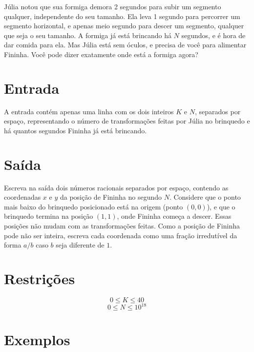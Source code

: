 Júlia notou que sua formiga demora 2 segundos para subir um segmento qualquer, independente do seu tamanho. Ela leva 1 segundo para percorrer um segmento horizontal, e apenas meio segundo para descer um segmento, qualquer que seja o seu tamanho. A formiga já está brincando há $N$ segundos, e é hora de dar comida para ela. Mas Júlia está sem óculos, e precisa de você para alimentar Fininha. Você pode dizer exatamente onde está a formiga agora?

\section*{Entrada}

A entrada contém apenas uma linha com os dois inteiros $K$ e $N$, separados por espaço, representando o número de transformações feitas por Júlia no brinquedo e há quantos segundos Fininha já está brincando.

\section*{Saída}

Escreva na saída dois números racionais separados por espaço, contendo as coordenadas $x$ e $y$ da posição de Fininha no segundo $N$. Considere que o ponto mais baixo do brinquedo
posicionado está na origem (ponto $(0, 0)$), e que o brinquedo termina na posição $(1, 1)$, onde Fininha começa a descer.
Essas posições não mudam com as transformações feitas. Como a posição de Fininha pode não ser inteira, escreva cada coordenada como uma fração irredutível da forma $a/b$ caso $b$ seja diferente de $1$.

\section*{Restrições}

$$0 \leq K \leq 40$$
$$0 \leq N \leq 10^{18}$$

\section*{Exemplos}
\exemplo
